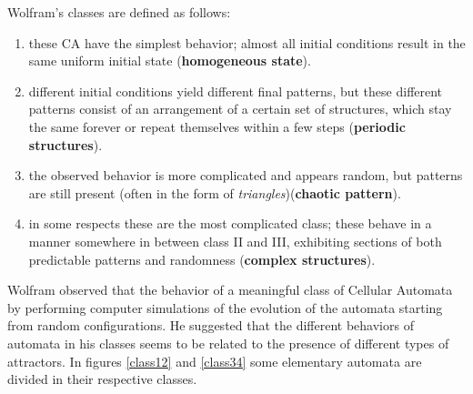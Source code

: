 Wolfram's classes are defined as follows:
\begin{enumerate}[I]
  \item these CA have the simplest behavior; almost all initial conditions
  result in the same uniform initial state (\textbf{homogeneous state}).
  \item different initial conditions yield different final patterns, but
  these different patterns consist of an arrangement of a certain set of
  structures, which stay the same forever or repeat themselves within a few
  steps (\textbf{periodic structures}).
  \item the observed behavior is more complicated and appears random, but
  patterns are still present (often in the form of \textit{triangles})(\textbf{chaotic pattern}).
  \item in some respects these are the most complicated class; these behave
  in a manner somewhere in between class II and III, exhibiting sections
   of both predictable patterns and randomness (\textbf{complex structures}).
\end{enumerate}
Wolfram  observed that the behavior of a meaningful class of Cellular Automata
by performing computer simulations of the evolution of the automata starting
from random configurations. He suggested that the different behaviors of
automata in his classes seems to be related to the presence of different types
of attractors.
In figures \ref{class12} and \ref{class34} some elementary automata are divided in their respective classes.
